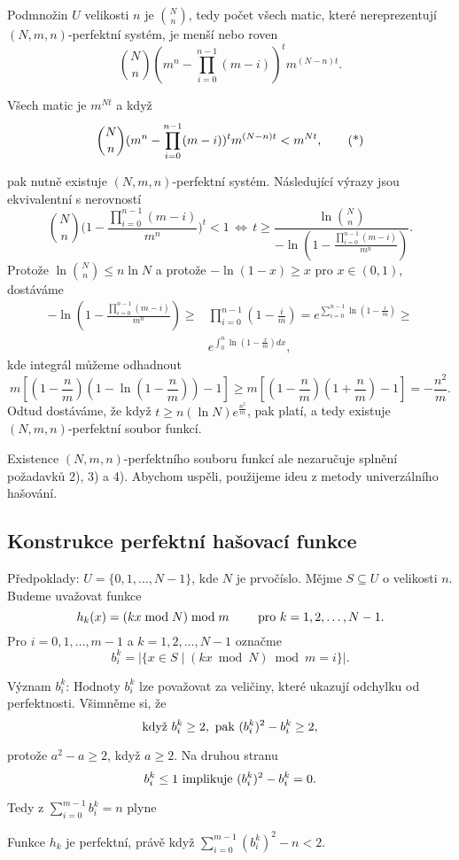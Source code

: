 \documentclass[a4paper,12pt]{article}
\begin{document}
Podmnožin $U$ velikosti $n$ je $\binom Nn$, tedy počet všech 
matic, které nereprezentují $(N,m,n)$-perfektní systém, je 
menší nebo roven  
$$\binom Nn(m^n-\prod_{i=0}^{n-1}(m-i))^tm^{(N-n)t}.$$

Všech matic je $m^{Nt}$ a když 
$$\binom Nn(m^n-\prod_{i=0}^{n-1}(m-i))^tm^{(N-n)t}<m^{Nt},\tag *$$

pak nutně existuje $(N,m,n)$-perfektní systém. 
Následující vý\-ra\-zy jsou ekvivalentní s ne\-rov\-ností 
\thetag{$*$}
$$\binom Nn\big(1-\frac {\prod_{i=0}^{n-1}(m-i)}{m^n}\big)^t<1\,\Leftrightarrow\,
t\ge\frac {\ln\binom Nn}{-\ln(1-\frac {\prod_{i=0}^{n-1}(m-i)}{m^
n})}.$$
Protože $\ln\binom Nn\le n\ln N$ a protože $-\ln(1-x)\ge x$ pro $
x\in (0,1)$, dostáváme
\begin{align*}-\ln(1-\frac {\prod_{i=0}^{n-1}(m-i)}{m^n})\ge&\prod_{i=0}^{
n-1}(1-\frac im)=e^{\sum_{i=0}^{n-1}\ln(1-\frac im)}\ge\\
&e^{\int_0^n\ln(1-\frac xm)dx},\end{align*}
kde integrál můžeme odhadnout 
$$m[(1-\frac nm)(1-\ln(1-\frac nm))-1]\ge m[(1-\frac nm)(1+\frac 
nm)-1]=-\frac {n^2}m.$$
Odtud dostáváme, že když $t\ge n(\ln N)e^{\frac {n^2}m}$, pak \thetag{*} platí, a tedy 
existuje $(N,m,n)$-perfektní soubor funkcí. 

Existence $(N,m,n)$-perfektního souboru funkcí ale 
nezaručuje splnění požadavků 2), 3) a 4).  
Abychom uspěli, použijeme ideu z metody univerzálního 
hašování.  

\subsection{
Konstrukce perfektní hašovací funkce
}

Předpoklady:  $U=\{0,1,\dots,N-1\}$, kde $N$ je 
prvočíslo.  Mějme $S\subseteq U$ o velikosti $n$.  Budeme 
uvažovat funkce 
$$h_k(x)=(kx\bmod N)\bmod m\qquad\text{\rm\ pro }k=1,2,\dots,N-1.$$
Pro $i=0,1,\dots,m-1$ a $k=1,2,\dots,N-1$ označme 
$$b_i^k=|\{x\in S\mid (kx\bmod N)\bmod m=i\}|.$$

Význam $b_i^k$: Hodnoty $b_i^k$ lze považovat za 
veličiny, které ukazují odchylku od perfektnosti. 
Všimněme si, že 
$$\text{\rm když }b_i^k\ge 2,\text{\rm\ pak }(b_i^k)^2-b_i^k\ge 
2,$$

protože $a^2-a\ge 2$, když $a\ge 2$. Na druhou stranu 
$$b_i^k\le 1\text{\rm\ implikuje }(b_i^k)^2-b_i^k=0.$$

Tedy z $\sum_{i=0}^{m-1}b_i^k=n$ plyne 

\begin{veta}Funkce $h_k$ je perfektní, právě když 
$\sum_{i=0}^{m-1}(b_i^k)^2-n<2$.
\end{veta}
\end{document}
